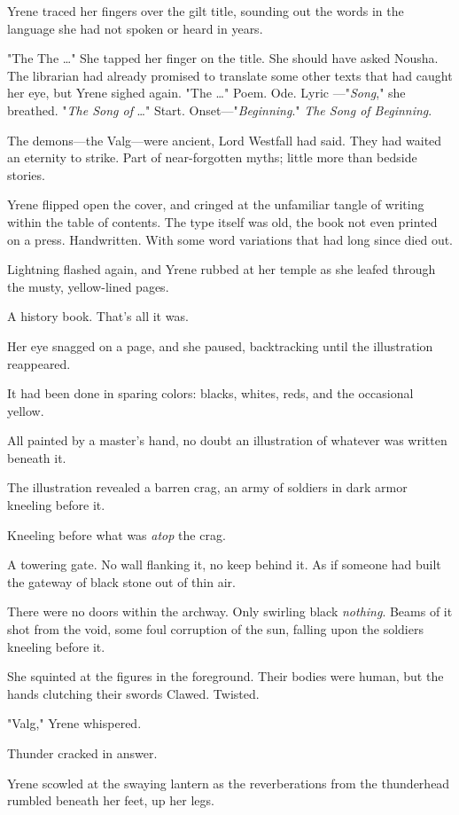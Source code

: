 Yrene traced her fingers over the gilt title, sounding out the words in the language she had not spoken or heard in years.

"The  The \ldots" She tapped her finger on the title. She should have asked Nousha. The librarian had already promised to translate some other texts that had caught her eye, but  Yrene sighed again. "The \ldots" Poem. Ode. Lyric ---"\emph{Song}," she breathed. "\emph{The Song of} \ldots" Start. Onset---"\emph{Beginning}." \emph{The Song of Beginning}.

The demons---the Valg---were ancient, Lord Westfall had said. They had waited an eternity to strike. Part of near-forgotten myths; little more than bedside stories.

Yrene flipped open the cover, and cringed at the unfamiliar tangle of writing within the table of contents. The type itself was old, the book not even printed on a press. Handwritten. With some word variations that had long since died out.

Lightning flashed again, and Yrene rubbed at her temple as she leafed through the musty, yellow-lined pages.

A history book. That's all it was.

Her eye snagged on a page, and she paused, backtracking until the illustration reappeared.

It had been done in sparing colors: blacks, whites, reds, and the occasional yellow.

All painted by a master's hand, no doubt an illustration of whatever was written beneath it.

The illustration revealed a barren crag, an army of soldiers in dark armor kneeling before it.

Kneeling before what was \emph{atop} the crag.

A towering gate. No wall flanking it, no keep behind it. As if someone had built the gateway of black stone out of thin air.

There were no doors within the archway. Only swirling black
\emph{nothing}. Beams of it shot from the void, some foul corruption of the sun, falling upon the soldiers kneeling before it.

She squinted at the figures in the foreground. Their bodies were human, but the hands clutching their swords  Clawed. Twisted.

"Valg," Yrene whispered.

Thunder cracked in answer.

Yrene scowled at the swaying lantern as the reverberations from the thunderhead rumbled beneath her feet, up her legs.

